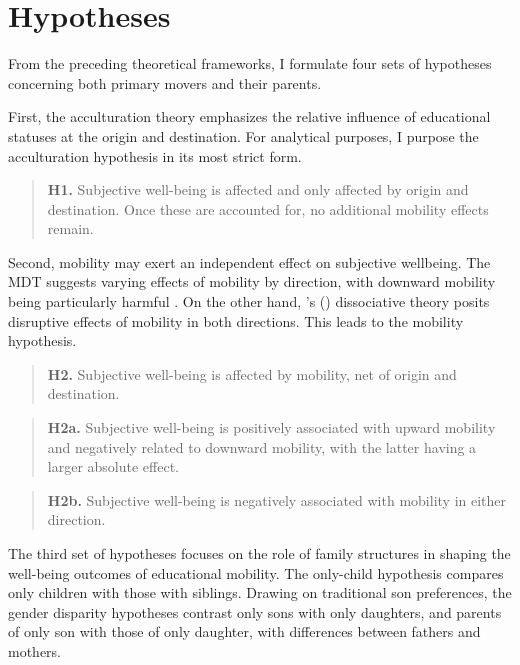 \section{Hypotheses}
\label{sec:ch2-hypotheses}

From the preceding theoretical frameworks, I formulate four sets of hypotheses concerning both primary movers and their parents.

First, the acculturation theory emphasizes the relative influence of educational statuses at the origin and destination. For analytical purposes, I purpose the acculturation hypothesis in its most strict form.

\begin{quote}
    \textbf{H1.} Subjective well-being is affected and only affected by origin and destination. Once these are accounted for, no additional mobility effects remain.
\end{quote}

Second, mobility may exert an independent effect on subjective wellbeing. The MDT suggests varying effects of mobility by direction, with downward mobility being particularly harmful \parencite{michalosMultipleDiscrepanciesTheory1985}. On the other hand, \citeauthor{sorokin1927social}'s (\citeyear{sorokin1927social}) dissociative theory posits disruptive effects of mobility in both directions. This leads to the mobility hypothesis.

\begin{quote}
    \textbf{H2.} Subjective well-being is affected by mobility, net of origin and destination.
\end{quote}

\begin{quote}
    \textbf{H2a.} Subjective well-being is positively associated with upward mobility and negatively related to downward mobility, with the latter having a larger absolute effect.
\end{quote}

\begin{quote}
    \textbf{H2b.} Subjective well-being is negatively associated with mobility in either direction.
\end{quote}

The third set of hypotheses focuses on the role of family structures in shaping the well-being outcomes of educational mobility. The only-child hypothesis compares only children with those with siblings. Drawing on traditional son preferences, the gender disparity hypotheses contrast only sons with only daughters, and parents of only son with those of only daughter, with differences between fathers and mothers.

